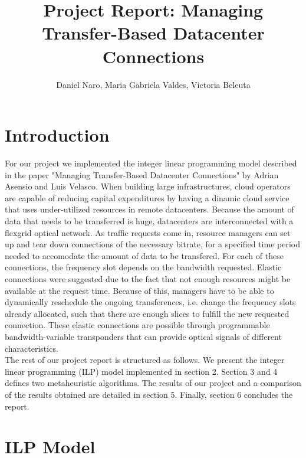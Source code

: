 \documentclass[11pt,a4paper]{article}
\title{Project Report: Managing Transfer-Based Datacenter Connections}
\author{Daniel Naro, Maria Gabriela Valdes, Victoria Beleuta}
\begin{document}
\maketitle
\section{Introduction}

For our project we implemented the integer linear programming model described in the paper "Managing Transfer-Based Datacenter Connections" by Adrian Asensio and Luis Velasco. When building large infrastructures, cloud operators are capable of reducing capital expenditures by having a dinamic cloud service that uses under-utilized resources in remote datacenters. Because the amount of data that needs to be transferred is huge, datacenters are interconnected with a flexgrid optical network. As traffic requests come in, resource managers can set up and tear down connections of the necessary bitrate, for a specified time period needed to accomodate the amount of data to be transfered. For each of these connections, the frequency slot depends on the bandwidth requested.  Elastic connections were suggested due to the fact that not enough resources might be available at the request time. Because of this, managers have to be able to dynamically reschedule the ongoing transferences, i.e. change the frequency slots already allocated, such that there are enough slices to fulfill the new requested connection. These elastic connections are possible through programmable bandwidth-variable transponders that can provide optical signals of different characteristics.\\

The rest of our project report is structured as follows. We present the integer linear programming (ILP) model implemented in section 2. Section 3 and 4 defines two metaheuristic algorithms. The results of our project and a comparison of the results obtained are detailed in section 5. Finally, section 6 concludes the report.

\section{ILP Model}
\end{document}
